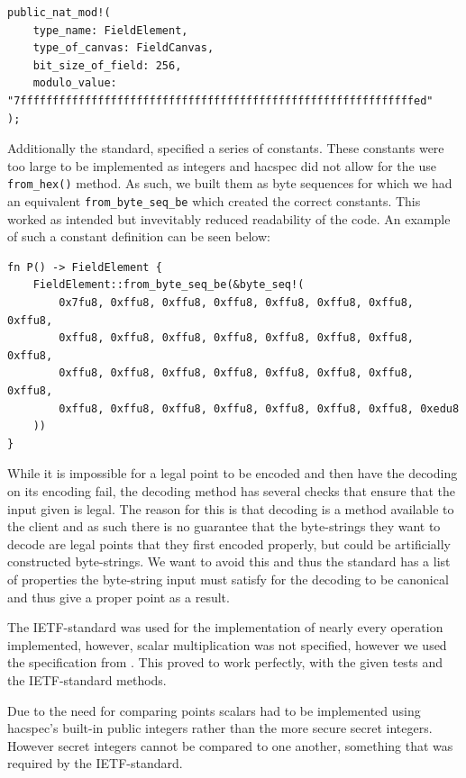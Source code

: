\documentclass{article}
\begin{document}
\begin{lstlisting}
public_nat_mod!(
    type_name: FieldElement,
    type_of_canvas: FieldCanvas,
    bit_size_of_field: 256,
    modulo_value: "7fffffffffffffffffffffffffffffffffffffffffffffffffffffffffffffed"
);
\end{lstlisting}

Additionally the standard, specified a series of constants. These
constants were too large to be implemented as integers and hacspec
did not allow for the use \texttt{from\_hex()} method. As such,
we built them as byte sequences for which we had an equivalent
\texttt{from\_byte\_seq\_be} which created the correct constants. This
worked as intended but invevitably reduced readability of the code. An
example of such a constant definition can be seen below:

\begin{lstlisting}
fn P() -> FieldElement {
    FieldElement::from_byte_seq_be(&byte_seq!(
        0x7fu8, 0xffu8, 0xffu8, 0xffu8, 0xffu8, 0xffu8, 0xffu8, 0xffu8,
        0xffu8, 0xffu8, 0xffu8, 0xffu8, 0xffu8, 0xffu8, 0xffu8, 0xffu8,
        0xffu8, 0xffu8, 0xffu8, 0xffu8, 0xffu8, 0xffu8, 0xffu8, 0xffu8,
        0xffu8, 0xffu8, 0xffu8, 0xffu8, 0xffu8, 0xffu8, 0xffu8, 0xedu8
    ))
}
\end{lstlisting}

While it is impossible for a legal point to be encoded and then have the
decoding on its encoding fail, the decoding method has several checks
that ensure that the input given is legal. The reason for this
is that decoding is a method available to the client and as such there
is no guarantee that the byte-strings they want to decode are legal
points that they first encoded properly, but could be artificially
constructed byte-strings. We want to avoid this and thus the standard
has a list of properties the byte-string input must satisfy for the
decoding to be canonical and thus give a proper point as a result.

The IETF-standard was used for the implementation of nearly every
operation implemented, however, scalar multiplication was not specified,
however we used the specification from \cite{elliptic-curves}. This
proved to work perfectly, with the given tests and the IETF-standard
methods.

Due to the need for comparing points scalars had to be implemented using
hacspec's built-in public integers rather than the more secure secret
integers. However secret integers cannot be compared to one another,
something that was required by the IETF-standard.
\end{document}
